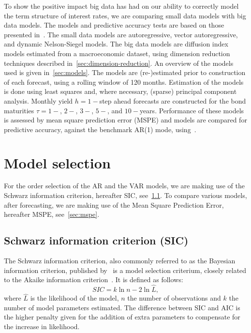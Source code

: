 To show the positive impact big data has had on our ability to correctly model the term structure of interest rates, we are comparing small data models with big data models. 
The models and predictive accuracy tests are based on those presented in~\textcite{swanson_big_2017}. 
The small data models are autoregressive, vector autoregressive, and dynamic Nelson-Siegel models. 
The big data models are diffusion index models estimated from a macroeconomic dataset, using dimension reduction techniques described in~\cref{sec:dimension-reduction}. 
An overview of the models used is given in~\cref{sec:models}.
The models are (re-)estimated prior to construction of each forecast, using a rolling window of 120 months.
Estimation of the models is done using least squares and, where necessary, (sparse) principal component analysis. 
Monthly yield $h = 1-$step ahead forecasts are constructed for the bond maturities $\tau = 1-$, $2-$, $3-$, $5-$, and $10-$years. 
Performance of these models is assessed by mean square prediction error (MSPE) and models are compared for predictive accuracy, against the benchmark AR(1) mode, using~\textcite[hereafter DM]{diebold_comparing_1994}. 

\section{Model selection}
For the order selection of the AR and the VAR models, we are making use of the Schwarz information criterion, hereafter SIC, see~\cref{sec:sic}. 
To compare various models, after forecasting, we are making use of the Mean Square Prediction Error, hereafter MSPE, see~\cref{sec:mspe}.

\subsection{Schwarz information criterion (SIC)}
\label{sec:sic}
The Schwarz information criterion, also commonly referred to as the Bayesian information criterion, published by~\textcite[hereafter SIC]{schwarz_estimating_1978} is a model selection criterium, closely related to the Akaike information criterion~\parencite{akaike_new_1974}. 
It is defined as follows:
\begin{equation}
	SIC = k\ln{n} - 2\ln{\hat{L}},
\end{equation}
where $\hat{L}$ is the likelihood of the model, $n$ the number of observations and $k$ the number of model parameters estimated. The difference between SIC and AIC is the higher penalty given for the addition of extra parameters to compensate for the increase in likelihood.

